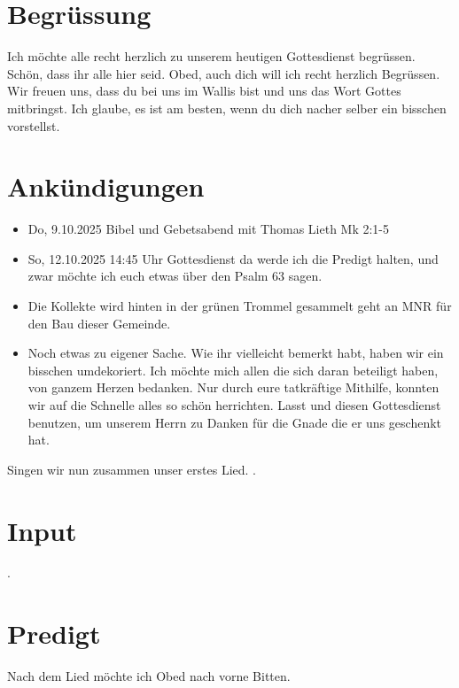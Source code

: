 \documentclass{mybib}
\begin{document}
\section{Begrüssung}
Ich möchte alle recht herzlich zu unserem heutigen Gottesdienst begrüssen. Schön, dass ihr alle hier seid. Obed, auch dich will ich recht herzlich Begrüssen. Wir freuen uns, dass du bei uns im Wallis bist und uns das Wort Gottes mitbringst. Ich glaube, es ist am besten, wenn du dich nacher selber ein bisschen vorstellst.

\beten{}

\section{Ankündigungen}
\begin{itemize}
    \item {} Do,  9.10.2025 Bibel und Gebetsabend mit Thomas Lieth Mk 2:1-5
    \item {} So, 12.10.2025 14:45 Uhr Gottesdienst da werde ich die Predigt halten, und zwar möchte ich euch etwas über den Psalm 63 sagen.    
    \item Die Kollekte wird hinten in der grünen Trommel gesammelt geht an MNR für den Bau dieser Gemeinde.
    \item Noch etwas zu eigener Sache. Wie ihr vielleicht bemerkt habt, haben wir ein bisschen umdekoriert. Ich möchte mich allen die sich daran beteiligt haben, von ganzem Herzen bedanken. Nur durch eure tatkräftige Mithilfe, konnten wir auf die Schnelle alles so schön herrichten. Lasst und diesen Gottesdienst benutzen, um unserem Herrn zu Danken für die Gnade die er uns geschenkt hat.
\end{itemize}

Singen wir nun zusammen unser erstes Lied.
{}.

\section{ Input }



.

\section{Predigt}
Nach dem Lied möchte ich Obed nach vorne Bitten.
\end{document}
